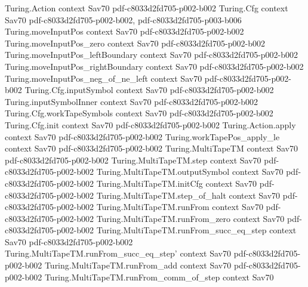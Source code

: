 \begin{theorem}
\label{Complexity.NPSPACE_subset_PSPACE}
\leanok
\proofstep
  {Turing.Action}
  {context}
  {Sav70}
  {pdf-c8033d2fd705-p002-b002}
\proofstep
  {Turing.Cfg}
  {context}
  {Sav70}
  {pdf-c8033d2fd705-p002-b002,
    pdf-c8033d2fd705-p003-b006}
\proofstep
  {Turing.moveInputPos}
  {context}
  {Sav70}
  {pdf-c8033d2fd705-p002-b002}
\proofstep
  {Turing.moveInputPos_zero}
  {context}
  {Sav70}
  {pdf-c8033d2fd705-p002-b002}
\proofstep
  {Turing.moveInputPos_leftBoundary}
  {context}
  {Sav70}
  {pdf-c8033d2fd705-p002-b002}
\proofstep
  {Turing.moveInputPos_rightBoundary}
  {context}
  {Sav70}
  {pdf-c8033d2fd705-p002-b002}
\proofstep
  {Turing.moveInputPos_neg_of_ne_left}
  {context}
  {Sav70}
  {pdf-c8033d2fd705-p002-b002}
\proofstep
  {Turing.Cfg.inputSymbol}
  {context}
  {Sav70}
  {pdf-c8033d2fd705-p002-b002}
\proofstep
  {Turing.inputSymbolInner}
  {context}
  {Sav70}
  {pdf-c8033d2fd705-p002-b002}
\proofstep
  {Turing.Cfg.workTapeSymbols}
  {context}
  {Sav70}
  {pdf-c8033d2fd705-p002-b002}
\proofstep
  {Turing.Cfg.init}
  {context}
  {Sav70}
  {pdf-c8033d2fd705-p002-b002}
\proofstep
  {Turing.Action.apply}
  {context}
  {Sav70}
  {pdf-c8033d2fd705-p002-b002}
\proofstep
  {Turing.workTapePos_apply_le}
  {context}
  {Sav70}
  {pdf-c8033d2fd705-p002-b002}
\proofstep
  {Turing.MultiTapeTM}
  {context}
  {Sav70}
  {pdf-c8033d2fd705-p002-b002}
\proofstep
  {Turing.MultiTapeTM.step}
  {context}
  {Sav70}
  {pdf-c8033d2fd705-p002-b002}
\proofstep
  {Turing.MultiTapeTM.outputSymbol}
  {context}
  {Sav70}
  {pdf-c8033d2fd705-p002-b002}
\proofstep
  {Turing.MultiTapeTM.initCfg}
  {context}
  {Sav70}
  {pdf-c8033d2fd705-p002-b002}
\proofstep
  {Turing.MultiTapeTM.step_of_halt}
  {context}
  {Sav70}
  {pdf-c8033d2fd705-p002-b002}
\proofstep
  {Turing.MultiTapeTM.runFrom}
  {context}
  {Sav70}
  {pdf-c8033d2fd705-p002-b002}
\proofstep
  {Turing.MultiTapeTM.runFrom_zero}
  {context}
  {Sav70}
  {pdf-c8033d2fd705-p002-b002}
\proofstep
  {Turing.MultiTapeTM.runFrom_succ_eq_step}
  {context}
  {Sav70}
  {pdf-c8033d2fd705-p002-b002}
\proofstep
  {Turing.MultiTapeTM.runFrom_succ_eq_step'}
  {context}
  {Sav70}
  {pdf-c8033d2fd705-p002-b002}
\proofstep
  {Turing.MultiTapeTM.runFrom_add}
  {context}
  {Sav70}
  {pdf-c8033d2fd705-p002-b002}
\proofstep
  {Turing.MultiTapeTM.runFrom_comm_of_step}
  {context}
  {Sav70}

\end{theorem}

